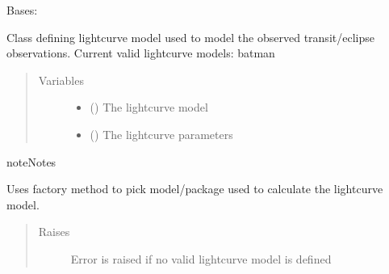 \documentclass[a4paper,11pt,english]{sphinxmanual}
\begin{document}
\begin{fulllineitems}
\label{\detokenize{cascade.exoplanet_tools:cascade.exoplanet_tools.exoplanet_tools.lightcuve}}
Bases: 

Class defining lightcurve model used to model the observed
transit/eclipse observations.
Current valid lightcurve models: batman
\begin{quote}\begin{description}
\item[{Variables}] \leavevmode\begin{itemize}
\item {} 
 () \textendash{} The lightcurve model

\item {} 
 () \textendash{} The lightcurve parameters

\end{itemize}

\end{description}\end{quote}

\begin{sphinxadmonition}{note}{Notes}

Uses factory method to pick model/package used to calculate
the lightcurve model.
\end{sphinxadmonition}
\begin{quote}\begin{description}
\item[{Raises}] \leavevmode
{} \textendash{} Error is raised if no valid lightcurve model is defined

\end{description}\end{quote}

\begin{fulllineitems}
\label{\detokenize{cascade.exoplanet_tools:cascade.exoplanet_tools.exoplanet_tools.lightcuve.valid_models}}
\end{fulllineitems}


\end{fulllineitems}
\end{document}

